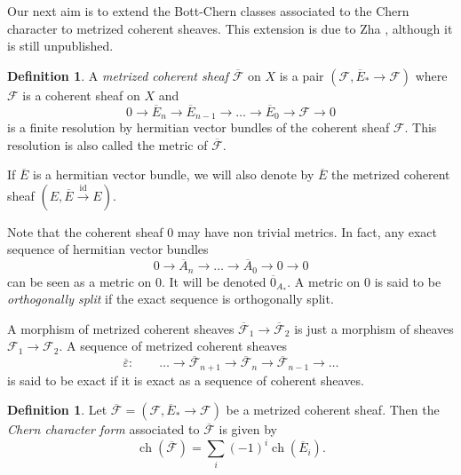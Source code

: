 \documentclass[10pt,twoside]{article}
\numberwithin{equation}{section}
\theoremstyle{plain}
\theoremstyle{definition}
\newtheorem{definition}[equation]{Definition}
\DeclareMathOperator{\ch}{ch}
\DeclareMathOperator{\Id}{id}
\begin{document}
Our next aim is to extend the Bott-Chern classes associated to the
Chern character to metrized coherent sheaves. This extension is due to
Zha \cite{zha99:_rieman_roch}, although it is still unpublished.

\begin{definition}\label{metrcohsh}
A \textit{metrized coherent sheaf} $\overline{\mathcal{F}}$ on
$X$ is a pair $(\mathcal{F}, \overline{E}_{\ast}\to
\mathcal{F})$ where $\mathcal{F}$ is a coherent sheaf on
$X$ and 
\begin{displaymath}
 0\to \overline{E}_{n}\to \overline{E}_{n-1}\to
\dots \to \overline{E}_{0}\to \mathcal{F} \to 0
\end{displaymath}
is
a finite resolution by hermitian vector bundles of the
coherent sheaf $\mathcal{F}$. This resolution is also called the metric of
$\overline{\mathcal{F}}$.

If $\overline E$ is a hermitian vector bundle, we will also denote by
$\overline E$ the metrized coherent sheaf $(E,\overline
E\overset{\Id}{\longrightarrow} E)$.
\end{definition}

Note that the coherent sheaf $0$ may have non trivial metrics. In fact,
any exact sequence of hermitian vector bundles
\begin{displaymath}
  0\to \overline {A}_{n}\to \dots \to \overline{A}_{0}\to 0\to 0
\end{displaymath}
can be seen as a metric on $0$. It will be denoted
$\overline {0}_{A_{\ast}}$. A metric on $0$ is said to be \emph{orthogonally split}
if the exact sequence is orthogonally split. 

A morphism of metrized coherent sheaves $\overline{\mathcal{F}}_1\to
\overline{\mathcal{F}}_2$ is just a morphism of sheaves
$\mathcal{F}_1\to \mathcal{F}_2$. A sequence of metrized coherent
sheaves
$$\overline{\varepsilon}\colon\qquad \ldots \longrightarrow
\overline{\mathcal{F}}_{n+1} \longrightarrow
\overline{\mathcal{F}}_n \longrightarrow
\overline{\mathcal{F}}_{n-1} \longrightarrow \ldots$$ 
is said to be
exact if it is exact as a sequence of coherent sheaves.

\begin{definition}
  Let  $\overline{\mathcal{F}}=(\mathcal{F}, \overline{E}_{\ast}\to
\mathcal{F})$ be a metrized coherent sheaf. Then the \emph{Chern character
form} associated to $\overline{\mathcal{F}}$ is given by
\begin{displaymath}
  \ch(\overline{\mathcal{F}}) =\sum_{i}(-1)^{i}\ch(\overline E_{i}).
\end{displaymath}
\end{definition}
\end{document}
